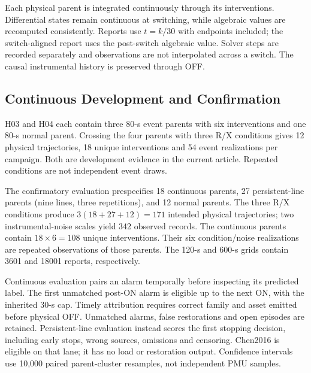Each physical parent is integrated continuously through its interventions.
Differential states remain continuous at switching, while algebraic values
are recomputed consistently. Reports use $t=k/30$ with endpoints included;
the switch-aligned report uses the post-switch algebraic value. Solver
steps are recorded separately and observations are not interpolated across
a switch. The causal instrumental history is preserved through OFF.

\subsection{Continuous Development and Confirmation}

H03 and H04 each contain three 80-s event parents with six interventions
and one 80-s normal parent. Crossing the four parents with three R/X
conditions gives 12 physical trajectories, 18 unique interventions and
54 event realizations per campaign. Both are development evidence in
the current article. Repeated conditions are not independent event draws.

The confirmatory evaluation prespecifies 18 continuous parents, 27 persistent-line parents
(nine lines, three repetitions), and 12 normal parents. The three R/X
conditions produce $3(18+27+12)=171$ intended physical trajectories;
two instrumental-noise scales yield 342 observed records. The continuous
parents contain $18\times6=108$ unique interventions. Their six
condition/noise realizations are repeated observations of those parents.
The 120-s and 600-s grids contain 3601 and 18001 reports, respectively.

Continuous evaluation pairs an alarm temporally before inspecting its
predicted label. The first unmatched post-ON alarm is eligible up to the
next ON, with the inherited 30-s cap. Timely attribution requires correct
family and asset emitted before physical OFF. Unmatched alarms, false
restorations and open episodes are retained. Persistent-line evaluation
instead scores the first stopping decision, including early stops,
wrong sources, omissions and censoring. Chen2016 is eligible on that lane;
it has no load or restoration output. Confidence intervals use 10,000
paired parent-cluster resamples, not independent PMU samples.


